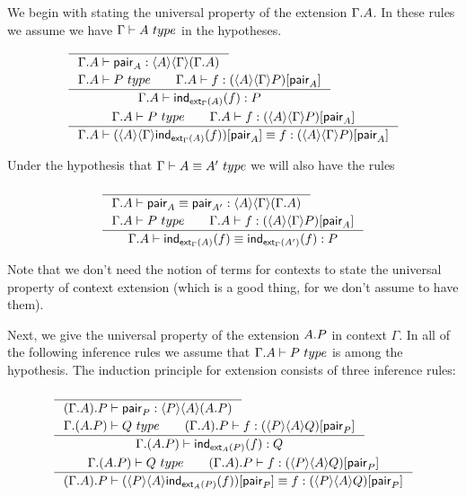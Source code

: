 We begin with stating the universal property of the extension $\ctxext{\Gamma}{A}$.
In these rules we assume we have $\jtype{\Gamma}{A}$ in the hypotheses.
\begin{align}
& \inference{}
{\jterm{\ctxext{\Gamma}{A}}{\ctxwk{A}{{\Gamma}{\ctxext{\Gamma}{A}}}}{\pair_A}}\\
& \inference{
  \jtype{\ctxext{\Gamma}{A}}{P}
  \qquad
  \jterm{\ctxext{\Gamma}{A}}{\subst{\pair_A}{\ctxwk{A}{{\Gamma}{P}}}}{f}}
  {\jterm{\ctxext{\Gamma}{A}}{P}{\ind{\tfext_\Gamma(A)}(f)}}\\
& \inference{
  \jtype{\ctxext{\Gamma}{A}}{P}
  \qquad
  \jterm{\ctxext{\Gamma}{A}}{\subst{\pair_A}{\ctxwk{A}{{\Gamma}{P}}}}{f}}
  {\jtermeq{\ctxext{\Gamma}{A}}{\subst{\pair_A}{\ctxwk{A}{{\Gamma}{P}}}}{\subst{\pair_A}{\ctxwk{A}{{\Gamma}{\ind{\tfext_\Gamma(A)}(f)}}}}{f}}
\end{align}

Under the hypothesis that $\jtypeeq{\Gamma}{A}{A'}$
we will also have the rules

\begin{align}
& \inference{}{\jtermeq{\ctxext{\Gamma}{A}}{\ctxwk{A}{{\Gamma}{\ctxext{\Gamma}{A}}}}{\pair_A}{\pair_{A'}}}\\
& \inference{\jtype{\ctxext{\Gamma}{A}}{P}\qquad\jterm{\ctxext{\Gamma}{A}}{\subst{\pair_A}{\ctxwk{A}{{\Gamma}{P}}}}{f}}
{\jtermeq{\ctxext{\Gamma}{A}}{P}{\ind{\tfext_\Gamma(A)}(f)}{\ind{\tfext_\Gamma(A')}(f)}}
\end{align}

Note that we don't need the notion of terms for contexts to state the universal
property of context extension (which is a good thing, for we don't assume to have them).

Next, we give the universal property of the extension $\ctxext{A}{P}$ in context
$\Gamma$.
In all of the following inference rules we assume that $\jtype{\ctxext{\Gamma}{A}}{P}$
is among the hypothesis. The induction principle for extension consists of three
inference rules:

\begin{align}
& \inference{}
{\jterm{\ctxext{{\Gamma}{A}}{P}}{\ctxwk{P}{{A}{\ctxext{A}{P}}}}{\pair_P}}\\
& \inference{
  \jtype{\ctxext{\Gamma}{{A}{P}}}{Q}
  \qquad
  \jterm{\ctxext{{\Gamma}{A}}{P}}{\subst{\pair_P}{\ctxwk{P}{{A}{Q}}}}{f}}
  {\jterm{\ctxext{\Gamma}{{A}{P}}}{Q}{\ind{\tfext_A(P)}(f)}}\\
& \inference{
  \jtype{\ctxext{\Gamma}{{A}{P}}}{Q}
  \qquad
  \jterm{\ctxext{{\Gamma}{A}}{P}}{\subst{\pair_P}{\ctxwk{P}{{A}{Q}}}}{f}}
  {\jtermeq{\ctxext{{\Gamma}{A}}{P}}{\subst{\pair_P}{\ctxwk{P}{{A}{Q}}}}{\subst{\pair_P}{\ctxwk{P}{{A}{\ind{\tfext_A(P)}(f)}}}}{f}}
\end{align}

